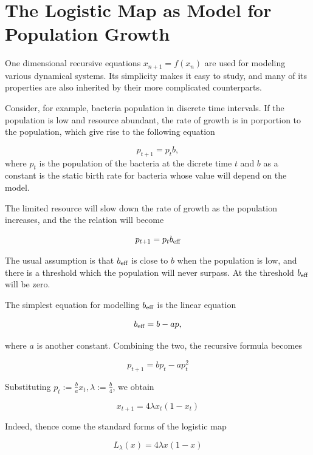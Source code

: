 \section{The Logistic Map as Model for Population Growth}

One dimensional recursive equations $x_{n+1} = f(x_n)$ are used for modeling various dynamical systems. 
Its simplicity makes it easy to study, and many of its properties are also inherited by their more complicated counterparts.

Consider, for example, bacteria population in discrete time intervals. 
If the population is low and resource abundant, the rate of growth is in porportion to the population, which give rise to the following equation

$$
p_{t+1} = p_{t} b,
$$
where $p_{t}$ is the population of the bacteria at the dicrete time $t$ and $b$ as a constant is the static birth rate for bacteria whose value will depend on the model.

The limited resource will slow down the rate of growth as the population increases, and the the relation will become 

$$
	p_{t+1} =  p_{t} b_\text{eff}
$$

The usual assumption is that $b_\text{eff}$ is close to $b$ when the population is low, and there is a threshold which the population will never surpass. At the threshold $b_\text{eff}$ will be zero.

The simplest equation for modelling $b_\text{eff}$ is the linear equation

$$
b_\text{eff} = b - ap,
$$

where $a$ is another constant.
Combining the two, the recursive formula becomes 

$$
p_{t+1}  = b p_t - ap_t^2
$$

Substituting $p_{t} := \frac{b}{a} x_{t}, \lambda := \frac{b}{4}$, we obtain

$$
x_{t+1} = 4 \lambda x_t(1-x_t) 
$$

Indeed, thence come the standard forms of the logistic map

\begin{equation}\label{eq_logistic}
	L_{\lambda}(x) = 4 \lambda x(1-x)
\end{equation}


